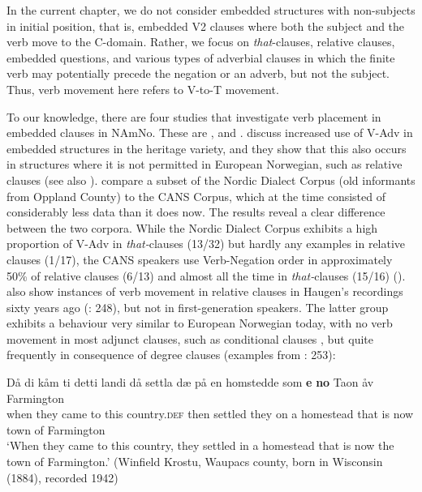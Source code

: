 \documentclass[output=paper]{langscibook}
\begin{document}
In the current chapter, we do not consider embedded structures with non-subjects in initial position, that is, embedded V2 clauses where both the subject and the verb move to the C-domain. Rather, we focus on \textit{that}{}-clauses, relative clauses, embedded questions, and various types of adverbial clauses in which the finite verb may potentially precede the negation or an adverb, but not the subject. Thus, verb movement here refers to V-to-T movement.

To our knowledge, there are four studies that investigate verb placement in embedded clauses in NAmNo. These are \citet{Taranrød2011}, \citet{LarssonJohannessen2015Embedded,LarssonJohannessen2015Incomplete} and \citet{JensbergEtAl2024}. \citet{LarssonJohannessen2015Embedded,LarssonJohannessen2015Incomplete} discuss increased use of V-Adv in embedded structures in the heritage variety, and they show that this also occurs in structures where it is not permitted in European Norwegian, such as relative clauses (see also \citealt{Taranrød2011}). \citet{LarssonJohannessen2015Embedded} compare a subset of the Nordic Dialect Corpus (old informants from Oppland County) to the CANS Corpus, which at the time consisted of considerably less data than it does now. The results reveal a clear difference between the two corpora. While the Nordic Dialect Corpus exhibits a high proportion of V-Adv in \textit{that-}clauses (13/32) but hardly any examples in relative clauses (1/17), the CANS speakers use Verb-Negation order in approximately 50\% of relative clauses (6/13) and almost all the time in \textit{that-}clauses (15/16) (\citealt{LarssonJohannessen2015Embedded}). \citet{LarssonJohannessen2015Embedded} also show instances of verb movement in relative clauses in Haugen’s recordings sixty years ago  (\citealt{LarssonJohannessen2015Embedded}: 248), but not in first-generation speakers. The latter group exhibits a behaviour very similar to European Norwegian today, with no verb movement in most adjunct clauses, such as conditional clauses , but quite frequently in consequence of degree clauses  (examples from \citealt{LarssonJohannessen2015Embedded}: 253):

\ea%
    \label{ex:anderssen:17}
    \gll Då     di     kåm   ti detti landi            då    settla   dæ   på en homstedde som \textbf{e}  \textbf{no}    Taon åv Farmington\\
		when they came to this  country.\textsc{def} then settled they on a   homestead that  is now town of  Farmington\\
\glt ‘When they came to this country, they settled in a homestead that is now the town of Farmington.’
          (Winfield Krostu, Waupacs county, born in Wisconsin (1884), recorded 1942) 
\end{document}
